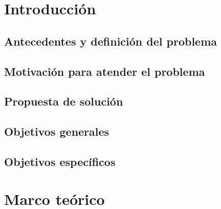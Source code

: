 \documentclass[12pt]{report}
\begin{document}
\newpage

 
\newpage


\newpage
\tableofcontents

\newpage
\listoftables
{} %
\listoffigures
{}
\lstlistoflistings

\chapter{Introducción}


\section{Antecedentes y definición del problema}


\section{Motivación para atender el problema}


\section{Propuesta de solución}


\section{Objetivos generales}


\section{Objetivos específicos}



\chapter{Marco teórico}

\end{document}
